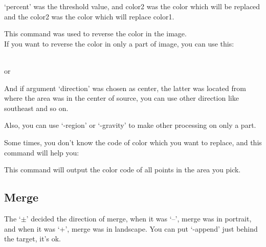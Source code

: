 \documentclass[12pt]{article}
\begin{document}
`percent' was the threshold value, and color2 was the color which will be replaced and the color2 was the color which will replace color1.\\

{\centering{}\par}\vspace{5mm}

This command was used to reverse the color in the image.\\

If you want to reverse the color in only a part of image, you can use this:\\

{\centering{}\\ \vspace{5mm}
or\\ \vspace{5mm}
\par}\vspace{5mm}

And if argument `direction' was chosen as center, the latter was located from where the area was in the center of source, you can use other direction like southeast and so on.

Also, you can use `-region' or `-gravity' to make other processing on only a part.

Some times, you don't know the code of color which you want to replace, and this command will help you:\vspace{5mm}

{\centering{}\par}\vspace{5mm}

This command will output the color code of all points in the area you pick.

\subsection{Merge}
{\centering{}\par}\vspace{5mm}

The `$\pm$' decided the direction of merge, when it was `\---', merge was in portrait, and when it was `+', merge was in landscape. You can put `-append' just behind the target, it's ok.
\end{document}
